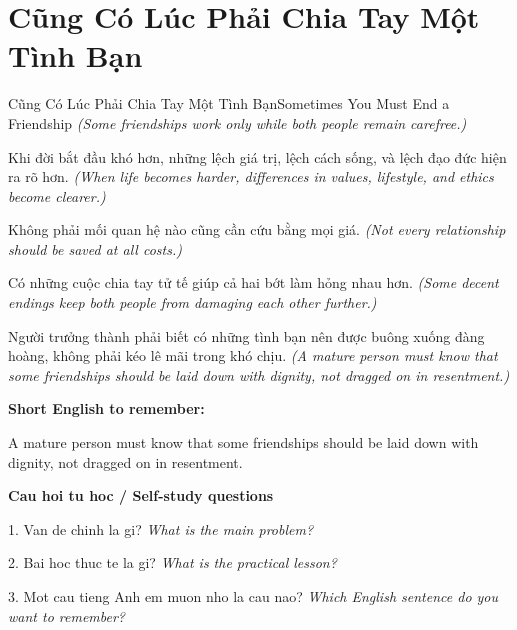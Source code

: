 \section{Cũng Có Lúc Phải Chia Tay Một Tình Bạn}
\begin{truyen}{Cũng Có Lúc Phải Chia Tay Một Tình Bạn}{Sometimes You Must End a Friendship}
\textit{(Some friendships work only while both people remain carefree.)}

Khi đời bắt đầu khó hơn, những lệch giá trị, lệch cách sống, và lệch đạo đức hiện ra rõ hơn.
\textit{(When life becomes harder, differences in values, lifestyle, and ethics become clearer.)}

Không phải mối quan hệ nào cũng cần cứu bằng mọi giá.
\textit{(Not every relationship should be saved at all costs.)}

Có những cuộc chia tay tử tế giúp cả hai bớt làm hỏng nhau hơn.
\textit{(Some decent endings keep both people from damaging each other further.)}

\end{truyen}

\begin{baihoc}
Người trưởng thành phải biết có những tình bạn nên được buông xuống đàng hoàng, không phải kéo lê mãi trong khó chịu.
\textit{(A mature person must know that some friendships should be laid down with dignity, not dragged on in resentment.)}
\end{baihoc}

\begin{ghinhoanh}
\textbf{Short English to remember:}

A mature person must know that some friendships should be laid down with dignity, not dragged on in resentment.

\end{ghinhoanh}

\begin{tuhocnhanh}
\textbf{Cau hoi tu hoc / Self-study questions}

1. Van de chinh la gi? \textit{What is the main problem?}

2. Bai hoc thuc te la gi? \textit{What is the practical lesson?}

3. Mot cau tieng Anh em muon nho la cau nao? \textit{Which English sentence do you want to remember?}
\end{tuhocnhanh}
\ngancach

